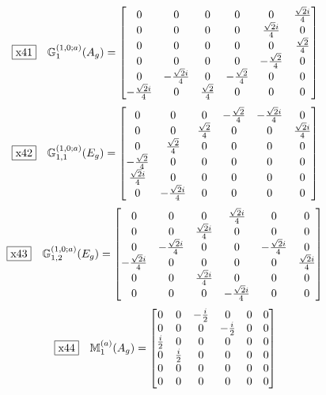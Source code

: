 \documentclass[fleqn,10pt,landscape]{jsarticle}
\begin{document}
\begin{dmath*}
\fbox{x41}\quad \mathbb{G}_{1}^{(1,0;a)}(A_{g})=\begin{bmatrix} 0 & 0 & 0 & 0 & 0 & \frac{\sqrt{2} i}{4} \\ 0 & 0 & 0 & 0 & \frac{\sqrt{2} i}{4} & 0 \\ 0 & 0 & 0 & 0 & 0 & \frac{\sqrt{2}}{4} \\ 0 & 0 & 0 & 0 & - \frac{\sqrt{2}}{4} & 0 \\ 0 & - \frac{\sqrt{2} i}{4} & 0 & - \frac{\sqrt{2}}{4} & 0 & 0 \\ - \frac{\sqrt{2} i}{4} & 0 & \frac{\sqrt{2}}{4} & 0 & 0 & 0 \end{bmatrix}
\end{dmath*}
\begin{dmath*}
\fbox{x42}\quad \mathbb{G}_{1,1}^{(1,0;a)}(E_{g})=\begin{bmatrix} 0 & 0 & 0 & - \frac{\sqrt{2}}{4} & - \frac{\sqrt{2} i}{4} & 0 \\ 0 & 0 & \frac{\sqrt{2}}{4} & 0 & 0 & \frac{\sqrt{2} i}{4} \\ 0 & \frac{\sqrt{2}}{4} & 0 & 0 & 0 & 0 \\ - \frac{\sqrt{2}}{4} & 0 & 0 & 0 & 0 & 0 \\ \frac{\sqrt{2} i}{4} & 0 & 0 & 0 & 0 & 0 \\ 0 & - \frac{\sqrt{2} i}{4} & 0 & 0 & 0 & 0 \end{bmatrix}
\end{dmath*}
\begin{dmath*}
\fbox{x43}\quad \mathbb{G}_{1,2}^{(1,0;a)}(E_{g})=\begin{bmatrix} 0 & 0 & 0 & \frac{\sqrt{2} i}{4} & 0 & 0 \\ 0 & 0 & \frac{\sqrt{2} i}{4} & 0 & 0 & 0 \\ 0 & - \frac{\sqrt{2} i}{4} & 0 & 0 & - \frac{\sqrt{2} i}{4} & 0 \\ - \frac{\sqrt{2} i}{4} & 0 & 0 & 0 & 0 & \frac{\sqrt{2} i}{4} \\ 0 & 0 & \frac{\sqrt{2} i}{4} & 0 & 0 & 0 \\ 0 & 0 & 0 & - \frac{\sqrt{2} i}{4} & 0 & 0 \end{bmatrix}
\end{dmath*}
\begin{dmath*}
\fbox{x44}\quad \mathbb{M}_{1}^{(a)}(A_{g})=\begin{bmatrix} 0 & 0 & - \frac{i}{2} & 0 & 0 & 0 \\ 0 & 0 & 0 & - \frac{i}{2} & 0 & 0 \\ \frac{i}{2} & 0 & 0 & 0 & 0 & 0 \\ 0 & \frac{i}{2} & 0 & 0 & 0 & 0 \\ 0 & 0 & 0 & 0 & 0 & 0 \\ 0 & 0 & 0 & 0 & 0 & 0 \end{bmatrix}
\end{dmath*}
\end{document}
